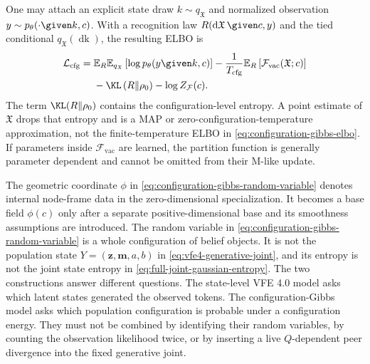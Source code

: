 One may attach an explicit state draw $k\sim q_{\mathfrak X}$ and normalized observation $y\sim p_\theta(\mathord{\cdot}\given k,c)$. With a recognition law $R(\mathop{\mathrm d\mathfrak X}\given c,y)$ and the tied conditional $q_{\mathfrak X}(\mathop{\mathrm dk})$, the resulting ELBO is
\begin{equation}
\begin{aligned}
\mathcal L_{\mathrm{cfg}}
={}&
\mathbb E_R\mathbb E_{q_{\mathfrak X}}
\left[
\log p_\theta(y\given k,c)
\right]
-\frac{1}{T_{\mathrm{cfg}}}
\mathbb E_R
\left[
\mathcal F_{\mathrm{vac}}(\mathfrak X;c)
\right]\\
&-\KL\left(R\Vert\rho_0\right)
-\log Z_{\mathcal F}(c).
\end{aligned}
\label{eq:configuration-gibbs-elbo}
\end{equation}
The term $\KL(R\Vert\rho_0)$ contains the configuration-level entropy. A point estimate of $\mathfrak X$ drops that entropy and is a MAP or zero-configuration-temperature approximation, not the finite-temperature ELBO in \cref{eq:configuration-gibbs-elbo}. If parameters inside $\mathcal F_{\mathrm{vac}}$ are learned, the partition function is generally parameter dependent and cannot be omitted from their M-like update.

The geometric coordinate $\phi$ in \cref{eq:configuration-gibbs-random-variable} denotes internal node-frame data in the zero-dimensional specialization. It becomes a base field $\phi(c)$ only after a separate positive-dimensional base and its smoothness assumptions are introduced. The random variable in \cref{eq:configuration-gibbs-random-variable} is a whole configuration of belief objects. It is not the population state $Y=(\boldsymbol z,\boldsymbol m,a,b)$ in \cref{eq:vfe4-generative-joint}, and its entropy is not the joint state entropy in \cref{eq:full-joint-gaussian-entropy}. The two constructions answer different questions. The state-level VFE 4.0 model asks which latent states generated the observed tokens. The configuration-Gibbs model asks which population configuration is probable under a configuration energy. They must not be combined by identifying their random variables, by counting the observation likelihood twice, or by inserting a live $Q$-dependent peer divergence into the fixed generative joint.
